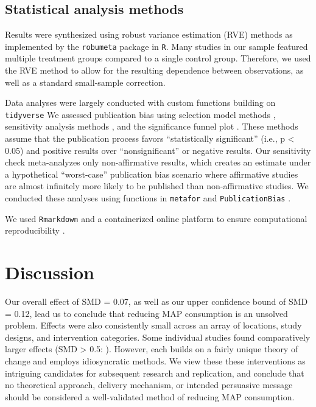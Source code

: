 \documentclass[sn-nature,referee,pdflatex]{sn-jnl}
\begin{document}
\subsection{Statistical analysis methods}\label{sec3.4}

Results were synthesized using robust variance estimation (RVE) methods
\citep{hedges2010} as implemented by the \texttt{robumeta} package
\citep{fisher2015} in \texttt{R}\citep{Rlang}. Many studies in our
sample featured multiple treatment groups compared to a single control
group. Therefore, we used the RVE method to allow for the resulting
dependence between observations, as well as a standard small-sample
correction.

Data analyses were largely conducted with custom functions building on
\texttt{tidyverse} \citep{wickham2019} We assessed publication bias
using selection model methods \citep{hedges1992, vevea1995}, sensitivity
analysis methods \citep{mathur2024}, and the significance funnel plot
\citep{mathur2020}. These methods assume that the publication process
favors ``statistically significant'' (i.e., p \textless{} 0.05) and
positive results over ``nonsignificant'' or negative results. Our
sensitivity check meta-analyzes only non-affirmative results, which
creates an estimate under a hypothetical ``worst-case'' publication bias
scenario where affirmative studies are almost infinitely more likely to
be published than non-affirmative studies. We conducted these analyses
using functions in \texttt{metafor} \citep{viechtbauer2010} and
\texttt{PublicationBias} \citep{mathur2020, mathur2024}.

We used \texttt{Rmarkdown} \citep{xie2018} and a containerized online
platform \citep{moreau2023, clyburne2019} to ensure computational
reproducibility \citep{polanin2020}.

\section{Discussion}\label{discussion}

Our overall effect of SMD = 0.07, as well as our upper confidence bound
of SMD = 0.12, lead us to conclude that reducing MAP consumption is an
unsolved problem. Effects were also consistently small across an array
of locations, study designs, and intervention categories. Some
individual studies found comparatively larger effects (SMD
\textgreater{} 0.5:
\citep{carfora2023, merrill2009, kanchanachitra2020, bianchi2022, piester2020}).
However, each builds on a fairly unique theory of change and employs
idiosyncratic methods. We view these these interventions as intriguing
candidates for subsequent research and replication, and conclude that no
theoretical approach, delivery mechanism, or intended persuasive message
should be considered a well-validated method of reducing MAP
consumption.
\end{document}
